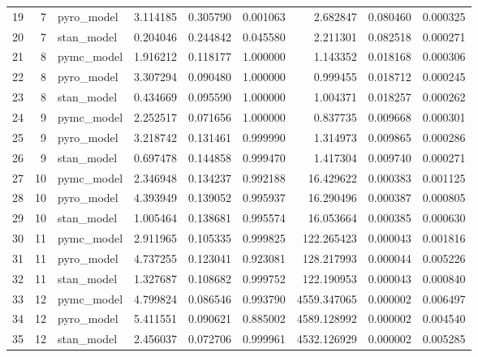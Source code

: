 \begin{tabular}{lrlrrrrrr}
19 & 7 & pyro_model & 3.114185 & 0.305790 & 0.001063 & 2.682847 & 0.080460 & 0.000325 \\
20 & 7 & stan_model & 0.204046 & 0.244842 & 0.045580 & 2.211301 & 0.082518 & 0.000271 \\
21 & 8 & pymc_model & 1.916212 & 0.118177 & 1.000000 & 1.143352 & 0.018168 & 0.000306 \\
22 & 8 & pyro_model & 3.307294 & 0.090480 & 1.000000 & 0.999455 & 0.018712 & 0.000245 \\
23 & 8 & stan_model & 0.434669 & 0.095590 & 1.000000 & 1.004371 & 0.018257 & 0.000262 \\
24 & 9 & pymc_model & 2.252517 & 0.071656 & 1.000000 & 0.837735 & 0.009668 & 0.000301 \\
25 & 9 & pyro_model & 3.218742 & 0.131461 & 0.999990 & 1.314973 & 0.009865 & 0.000286 \\
26 & 9 & stan_model & 0.697478 & 0.144858 & 0.999470 & 1.417304 & 0.009740 & 0.000271 \\
27 & 10 & pymc_model & 2.346948 & 0.134237 & 0.992188 & 16.429622 & 0.000383 & 0.001125 \\
28 & 10 & pyro_model & 4.393949 & 0.139052 & 0.995937 & 16.290496 & 0.000387 & 0.000805 \\
29 & 10 & stan_model & 1.005464 & 0.138681 & 0.995574 & 16.053664 & 0.000385 & 0.000630 \\
30 & 11 & pymc_model & 2.911965 & 0.105335 & 0.999825 & 122.265423 & 0.000043 & 0.001816 \\
31 & 11 & pyro_model & 4.737255 & 0.123041 & 0.923081 & 128.217993 & 0.000044 & 0.005226 \\
32 & 11 & stan_model & 1.327687 & 0.108682 & 0.999752 & 122.190953 & 0.000043 & 0.000840 \\
33 & 12 & pymc_model & 4.799824 & 0.086546 & 0.993790 & 4559.347065 & 0.000002 & 0.006497 \\
34 & 12 & pyro_model & 5.411551 & 0.090621 & 0.885002 & 4589.128992 & 0.000002 & 0.004540 \\
35 & 12 & stan_model & 2.456037 & 0.072706 & 0.999961 & 4532.126929 & 0.000002 & 0.005285 \\
\bottomrule
\end{tabular}
